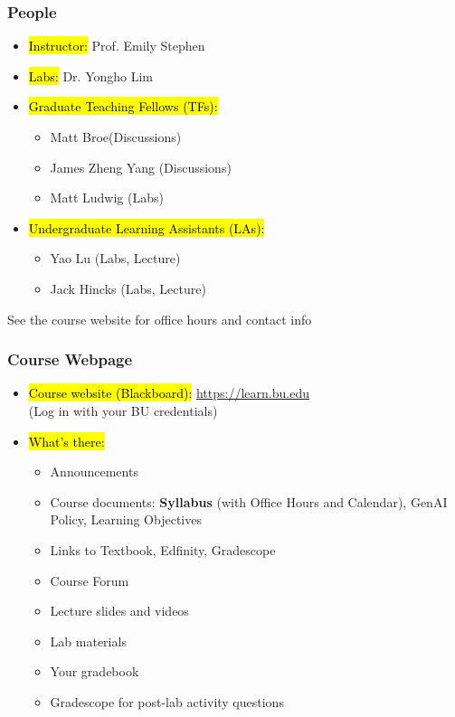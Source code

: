 \documentclass[slidestop,compress,mathserif]{beamer}
\begin{document}
\begin{frame}
	\frametitle{People}
	\begin{itemize}
		\item \hl{Instructor:} Prof. Emily Stephen
		\item \hl{Labs:} Dr. Yongho Lim
		\item \hl{Graduate Teaching Fellows (TFs):} 
		\begin{itemize}
			\item Matt Broe(Discussions)
			\item James Zheng Yang (Discussions)
			\item Matt Ludwig (Labs)
		\end{itemize}
		\item \hl{Undergraduate Learning Assistants (LAs):}
		\begin{itemize}
			\item Yao Lu (Labs, Lecture)
			\item Jack Hincks (Labs, Lecture)
		\end{itemize}
	\end{itemize}

	See the course website for office hours and contact info
\end{frame}


\begin{frame}
	\frametitle{Course Webpage} 
	\begin{itemize}
		\item \hl{Course website (Blackboard):} \url{https://learn.bu.edu} \\
		(Log in with your BU credentials)
		\item \hl{What's there:}
		\begin{itemize}
			\item Announcements
			\item Course documents: \textbf{Syllabus} (with Office Hours and Calendar), GenAI Policy, Learning Objectives
			\item Links to Textbook, Edfinity, Gradescope
			\item Course Forum
			\item Lecture slides and videos
			\item Lab materials
			\item Your gradebook
			\item Gradescope for post-lab activity questions
		\end{itemize}
	\end{itemize}	
\end{frame}
\end{document}
